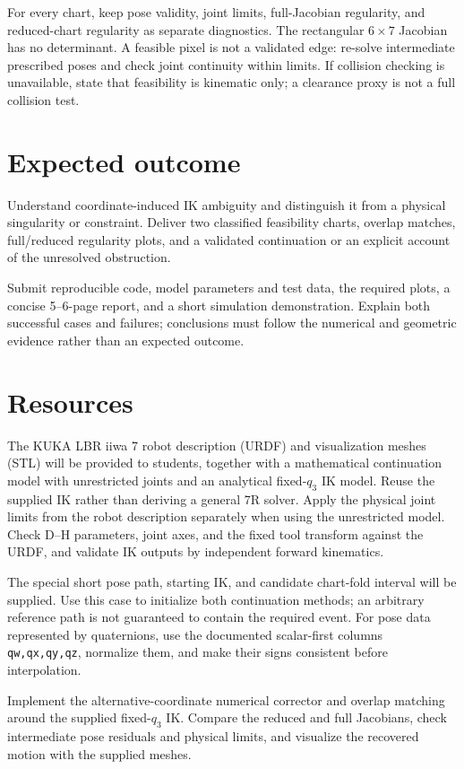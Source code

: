 \documentclass[11pt,a4paper]{article}
\begin{document}
For every chart, keep pose validity, joint limits,
full-Jacobian regularity, and reduced-chart regularity as separate diagnostics.
The rectangular $6\times7$ Jacobian has no determinant. A feasible pixel is
not a validated edge: re-solve intermediate prescribed poses and check joint
continuity within limits. If collision checking is unavailable, state that
feasibility is kinematic only; a clearance proxy is not a full collision test.

\section*{Expected outcome}
Understand coordinate-induced IK ambiguity and distinguish it from
a physical singularity or constraint. Deliver two classified feasibility
charts, overlap matches, full/reduced regularity plots, and a validated
continuation or an explicit account of the unresolved obstruction.

Submit reproducible code, model parameters and test data, the required plots,
a concise 5--6-page report, and a short simulation demonstration. Explain
both successful cases and failures; conclusions must follow the numerical
and geometric evidence rather than an expected outcome.

\section*{Resources}
The KUKA LBR iiwa 7 robot description (URDF) and visualization meshes
(STL) will be provided to students, together with a mathematical continuation
model with unrestricted joints and an analytical fixed-$q_3$ IK model. Reuse
the supplied IK rather than deriving a general 7R solver. Apply the physical
joint limits from the robot description separately when using the unrestricted
model. Check D--H parameters, joint axes, and the fixed tool transform against
the URDF, and validate IK outputs by independent forward kinematics.

The special short pose path, starting IK, and candidate chart-fold interval
will be supplied. Use this case to initialize both continuation methods;
an arbitrary reference path is not guaranteed to contain the required event.
For pose data represented by quaternions, use the documented scalar-first
columns \texttt{qw,qx,qy,qz}, normalize them, and make their signs consistent
before interpolation.

Implement the alternative-coordinate numerical corrector and overlap matching
around the supplied fixed-$q_3$ IK. Compare the reduced and full Jacobians,
check intermediate pose residuals and physical limits, and visualize the
recovered motion with the supplied meshes.
\end{document}
